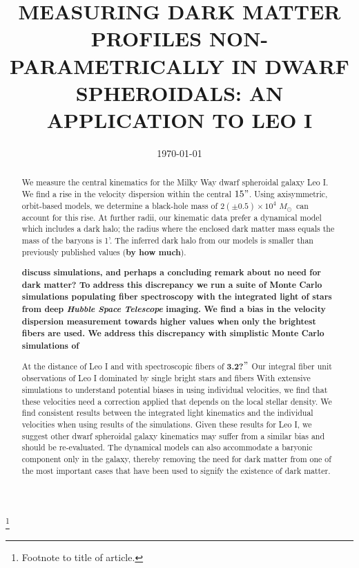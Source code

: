 \documentclass[%
 aip,
 twocolumn,
 jmp,%
 amsmath,amssymb,
 reprint,%
]{aastex61}
\newcommand{\Msun}{$M_{\odot}$}
\begin{document}

\title[MEASURING DARK MATTER PROFILES NON-PARAMETRICALLY IN DWARF SPHEROIDALS]{MEASURING DARK MATTER PROFILES NON-PARAMETRICALLY IN DWARF SPHEROIDALS:
	AN APPLICATION TO LEO I}%
\thanks{Footnote to title of article.}


\date{\today}%

\begin{abstract}

We measure the central kinematics for the Milky Way dwarf spheroidal
galaxy Leo I. We find a rise in the velocity dispersion within the 
central $15"$.  Using axisymmetric, orbit-based models, we determine 
a black-hole mass of $2(\pm0.5)\times10^4$ \Msun\ can account for 
this rise.  At further radii, our kinematic data prefer a dynamical 
model which includes a dark halo; the radius where the enclosed dark
matter mass equals the mass of the baryons is 1'.  The inferred dark halo
from our models is smaller than previously published values ({\bf by how much}).
{\bf discuss simulations, and perhaps a concluding remark about no need for dark matter?
To address this discrepancy we run a suite of Monte Carlo simulations populating
fiber spectroscopy with the integrated light of stars from deep 
{\it Hubble Space Telescope} imaging.  We find a bias in the velocity dispersion
measurement towards higher values when only the brightest fibers are used.
We address this discrepancy with simplistic Monte Carlo simulations of 

At the distance of Leo I and with spectroscopic fibers of {\bf 3.2?}$"$
Our integral fiber unit observations of Leo I  dominated by single bright stars and fibers 
With extensive simulations to understand
potential biases in using individual velocities, we find that these
velocities need a correction applied that depends on the local stellar
density. We find consistent results between the integrated light
kinematics and the individual velocities when using results of the
simulations. Given these results for Leo I, we suggest other dwarf
spheroidal galaxy kinematics may suffer from a similar bias and should
be re-evaluated. The dynamical models can also accommodate a baryonic
component only in the galaxy, thereby removing the need for dark
matter from one of the most important cases that have been used to
signify the existence of dark matter.}

\end{abstract}
\end{document}

